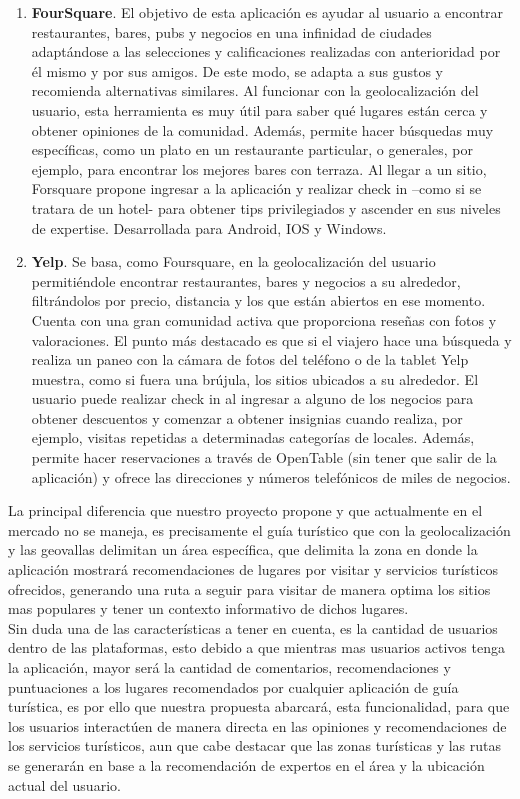 \begin{enumerate}
	\item \textbf{FourSquare}. El objetivo de esta aplicación es ayudar al usuario a encontrar restaurantes, bares, pubs y negocios en una infinidad de ciudades adaptándose a las selecciones y calificaciones realizadas con anterioridad por él mismo y por sus amigos. De este modo, se adapta a sus gustos y recomienda alternativas similares. Al funcionar con la geolocalización del usuario, esta herramienta es muy útil para saber qué lugares están cerca y obtener opiniones de la comunidad. Además, permite hacer búsquedas muy específicas, como un plato en un restaurante particular, o generales, por ejemplo, para encontrar los mejores bares con terraza. Al llegar a un sitio, Forsquare propone ingresar a la aplicación y realizar check in –como si se tratara de un hotel- para obtener tips privilegiados y ascender en sus niveles de expertise. Desarrollada para Android, IOS y Windows.
	
	\item  \textbf{Yelp}. Se basa, como Foursquare, en la geolocalización del usuario permitiéndole encontrar restaurantes, bares y negocios a su alrededor, filtrándolos por precio, distancia y los que están abiertos en ese momento. Cuenta con una gran comunidad activa que proporciona reseñas con fotos y valoraciones. El punto más destacado es que si el viajero hace una búsqueda y realiza un paneo con la cámara de fotos del teléfono o de la tablet Yelp muestra, como si fuera una brújula, los sitios ubicados a su alrededor. El usuario puede realizar check in al ingresar a alguno de los negocios para obtener descuentos y comenzar a obtener insignias cuando realiza,  por ejemplo, visitas repetidas a determinadas categorías de locales. Además, permite hacer reservaciones a través de OpenTable (sin tener que salir de la aplicación) y ofrece las direcciones y números telefónicos de miles de negocios.
\end{enumerate}

La principal diferencia que nuestro proyecto propone y que actualmente en el mercado no se maneja, es precisamente el guía turístico que con la geolocalización y las geovallas delimitan un área específica, que delimita la zona en donde la aplicación mostrará recomendaciones de lugares por visitar y servicios turísticos ofrecidos, generando una ruta a seguir para visitar de manera optima los sitios mas populares y tener un contexto informativo de dichos lugares.\\

Sin duda una de las características a tener en cuenta, es la cantidad de usuarios dentro de las plataformas, esto debido a que mientras mas usuarios activos tenga la aplicación, mayor será la cantidad de comentarios, recomendaciones y puntuaciones a los lugares recomendados por cualquier aplicación de guía turística, es por ello que nuestra propuesta abarcará, esta funcionalidad, para que los usuarios interactúen de manera directa en las opiniones y recomendaciones de los servicios turísticos, aun que cabe destacar que las zonas turísticas y las rutas se generarán en base a la recomendación de expertos en el área y la ubicación actual del usuario. \\

